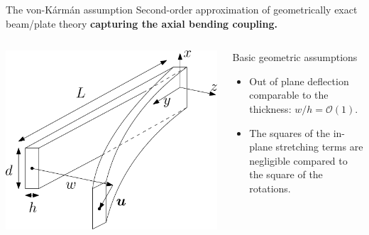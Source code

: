 \documentclass[aspectratio=169]{beamer}
\begin{document}
\begin{frame}{The von-K\'arm\'an assumption}
Second-order approximation of geometrically exact beam/plate theory \textbf{capturing the axial bending coupling.}	

\begin{columns}
	\begin{column}{.5\textwidth}
	\includegraphics[width=.9\textwidth]{beam_deflected.eps}
	\end{column}
	\begin{column}{.5\textwidth}
	
	\begin{block}{Basic geometric assumptions}
		\begin{itemize}
		\item Out of plane deflection comparable to the thickness: $w/h = \mathcal{O}(1)$.
		\item The squares of the in-plane stretching terms are negligible compared to the square of the rotations.
		\end{itemize}
		
	\end{block}
	
	\end{column}
\end{columns}

\end{frame}
\end{document}
